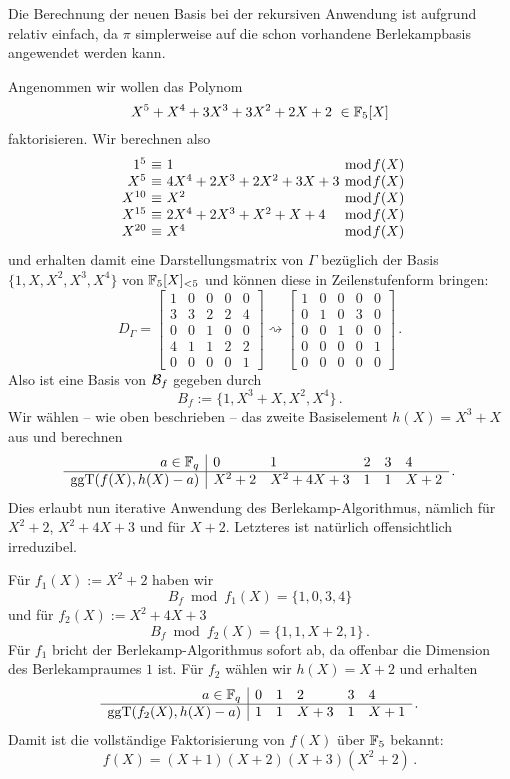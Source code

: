 
Die Berechnung der neuen Basis bei der rekursiven Anwendung ist aufgrund
 relativ einfach, da $\pi$ simplerweise auf die schon
vorhandene Berlekampbasis angewendet werden kann.

\begin{beispiel}
  Angenommen wir wollen das Polynom
  \[ X^5 + X^4 + 3 X^3 + 3 X^2 + 2 X + 2 \ \in \mathbb{F}_5[X]\]
  faktorisieren. Wir berechnen also
  \[ \begin{array}{r@{\ \equiv\ }l@{\ \bmod f(X)}}
    1^5 & 1\\
    X^5 & 4X^4 + 2X^3 + 2 X^2+ 3X + 3\\
    X^{10} & X^2\\
    X^{15} & 2X^4 + 2X^3 + X^2 + X + 4\\
    X^{20} & X^4
  \end{array} \]
  und erhalten damit eine Darstellungsmatrix von $\Gamma$ bezüglich der Basis
  $\{ 1, X, X^2, X^3, X^4\}$ von $\mathbb{F}_5[X]_{<5}$ und können diese in
  Zeilenstufenform bringen:
  \[ D_\Gamma = \begin{bmatrix}
      1& 0& 0& 0& 0\\
      3& 3& 2& 2& 4\\
      0& 0& 1& 0& 0\\
      4& 1& 1& 2& 2\\
      0& 0& 0& 0& 1\end{bmatrix} \rightsquigarrow
      \begin{bmatrix}
      1& 0& 0& 0& 0\\
      0& 1& 0& 3& 0\\
      0& 0& 1& 0& 0\\
      0& 0& 0& 0& 1\\
      0& 0& 0& 0& 0\end{bmatrix}\,. \]
  Also ist eine Basis von $\mathcal{B}_f$ gegeben durch
  \[ B_f := \{ 1, X^3 +X, X^2, X^4\}\,.\]
  Wir wählen -- wie oben beschrieben -- das zweite Basiselement $h(X) = X^3 +X$
  aus und berechnen
  \[ \begin{array}{r|lllll}
      a\in \mathbb{F}_q & 0 & 1 & 2 & 3 & 4 \\\hline
      \operatorname{ggT}(f(X), h(X)-a) & X^2+2 & X^2+4X+3 & 1 & 1 & X+2\end{array}\,.\]
  Dies erlaubt nun iterative Anwendung des Berlekamp-Algorithmus, nämlich für
  $X^2+2$, $X^2+4X+3$ und für $X+2$. Letzteres ist natürlich offensichtlich
  irreduzibel.

  Für $f_1(X) := X^2+2$ haben wir
  \[ B_f \bmod f_1(X) = \{ 1, 0, 3, 4\}\]
  und für $f_2(X) := X^2+4X+3$
  \[ B_f \bmod f_2(X) = \{1,1,X+2,1\}\,.\]
  Für $f_1$ bricht der Berlekamp-Algorithmus sofort ab, da offenbar die
  Dimension des Berlekampraumes $1$ ist.
  Für $f_2$ wählen wir $h(X) = X+2$ und erhalten
  \[ \begin{array}{r|lllll}
      a\in \mathbb{F}_q & 0 & 1 & 2 & 3 & 4 \\\hline
      \operatorname{ggT}(f_2(X), h(X)-a) & 1 & 1 & X+3 & 1 & X+1\end{array}\,.\]
  Damit ist die vollständige Faktorisierung von $f(X)$ über $\mathbb{F}_5$ bekannt:
  \[ f(X) = (X+1)(X+2)(X+3)(X^2+2)\,.\]
\end{beispiel}
